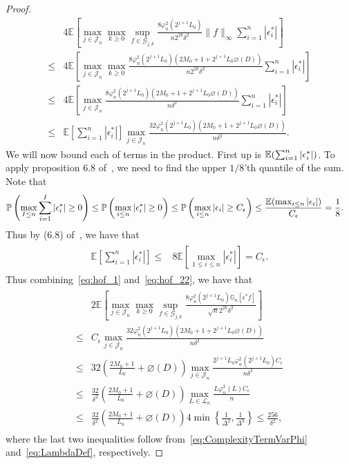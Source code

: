 \begin{proof}
\begin{align}
&4\mathbb{E}\left[\max_{j\in \mathcal{J}_n}\max_{k \ge 0}\sup_{f\in\mathcal{G}_{j,k}} \frac{8\varphi_n^2(2^{j+1}L_0)}{n2^{2k}\delta^2} \|f\|_{\infty}\sum_{i=1}^n  |\epsilon^*_{i}|\right]\nonumber\\
\le{}&4\mathbb{E}\left[\max_{j\in \mathcal{J}_n}\max_{k \ge 0} \frac{8\varphi_n^2(2^{j+1}L_0)(2M_0 + 1 + 2^{j+1}L_0\diameter(D))}{n2^{2k}\delta^2}\sum_{i=1}^n  |\epsilon^*_{i}|\right]\nonumber\\
\le{}&4\mathbb{E}\left[\max_{j\in \mathcal{J}_n} \frac{8\varphi_n^2(2^{j+1}L_0)(2M_0 + 1 + 2^{j+1}L_0\diameter(D))}{n\delta^2}\sum_{i=1}^n  |\epsilon^*_{i}|\right]\nonumber\\
\le{}&\mathbb{E}\left[\sum_{i=1}^n  |\epsilon^*_{i}|\right]\max_{j\in \mathcal{J}_n} \frac{32\varphi_n^2(2^{j+1}L_0)(2M_0 + 1 + 2^{j+1}L_0\diameter(D))}{n\delta^2}.\label{eq:hof_22}
\end{align}
 We will now bound each of terms in the product. First up is $\mathbb{E}(\sum_{i=1 }^{n} |\epsilon^*_{i}|)$. To apply proposition 6.8 of~\cite{LED91}, we need to find the upper $1/8$'th quantile of the sum. Note that
\begin{align}
&\mathbb{P}\left(\max_{I\le n}  \sum_{i=1}^I |\epsilon^*_{i}| \ge 0 \right) \le \mathbb{P}\left(\max_{i\le n} |\epsilon^*_{i}| \ge 0\right) \le  \mathbb{P}\left(\max_{i\le n} |\epsilon_{i}| \ge C_\epsilon\right) \le \frac{\mathbb{E}(\max_{i\le n} |\epsilon_{i}|)}{C_\epsilon}= \frac{1}{8}.
\end{align}
Thus by (6.8) of~\cite{LED91}, we have that 
\begin{align}\label{eq:hof_2}
\begin{split}
\mathbb{E}\left[\sum_{i=1}^n |\epsilon^*_{i}|\right]\le & 8\mathbb{E}\left[\max_{1\le i\le n}\left|\epsilon^*_{i}\right|\right] = C_{\epsilon}.
\end{split}
\end{align}
Thus combining~\eqref{eq:hof_1} and~\eqref{eq:hof_22}, we have that
\begin{align}\label{eq:const}
\begin{split}& 2\mathbb{E}\left[\max_{j\in \mathcal{J}_n}\max_{k \ge 0}\sup_{f\in\mathcal{G}_{j,k}} \frac{8\varphi_n^2(2^{j+1}L_0)\mathbb{G}_n[\epsilon^* f]}{\sqrt{n}2^{2k}\delta^2}\right]\\
\le{}& C_\epsilon\max_{j\in \mathcal{J}_n} \frac{32\varphi_n^2(2^{j+1}L_0)(2M_0 + 1 + 2^{j+1}L_0\diameter(D))}{n\delta^2}\\
\le{}& 32\left(\frac{2M_0 + 1}{L_0} + \diameter(D)\right)\max_{j\in \mathcal{J}_n} \frac{2^{j+1}L_0\varphi_n^2(2^{j+1}L_0)C_\epsilon}{n\delta^2}\\
\le{}& \frac{32}{\delta^2}\left(\frac{2M_0 + 1}{L_0} + \diameter(D)\right)\max_{L\in\mathcal{L}_n} \frac{L\varphi_n^2(L) C_\epsilon}{n}\\
\le{}& \frac{32}{\delta^2}\left(\frac{2M_0 + 1}{L_0} + \diameter(D)\right) 4\min\left\{\frac{1}{\Delta^2}, \frac{1}{\Delta^3}\right\}
\le{} \frac{256}{\delta^2},
\end{split}
\end{align}
where the last two inequalities follow from~\eqref{eq:ComplexityTermVarPhi} and~\eqref{eq:LambdaDef}, respectively.
\end{proof}

